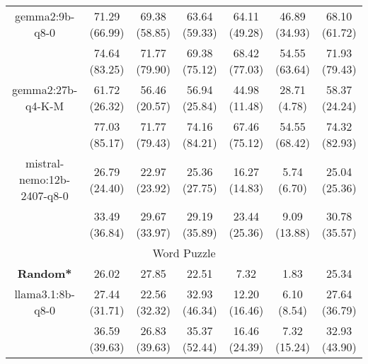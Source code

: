 \begin{table}[]
{\begin{tabular}{ccccccc}
        \multicolumn{1}{c|}{gemma2:9b-q8-0} & 71.29 (66.99) & 69.38 (58.85) & \multicolumn{1}{c|}{63.64 (59.33)} & 64.11 (49.28) & \multicolumn{1}{c|}{46.89 (34.93)} & 68.10 (61.72) \\
        
        

        \multicolumn{1}{c|}{} & 74.64 (83.25) & 71.77 (79.90) & \multicolumn{1}{c|}{69.38 (75.12)} & 68.42 (77.03) & \multicolumn{1}{c|}{54.55 (63.64)} & 71.93 (79.43) \\
        \cline{1-7}
        

        \multicolumn{1}{c|}{gemma2:27b-q4-K-M} & 61.72 (26.32) & 56.46 (20.57) & \multicolumn{1}{c|}{56.94 (25.84)} & 44.98 (11.48) & \multicolumn{1}{c|}{28.71 (4.78)} & 58.37 (24.24) \\
        
        

        \multicolumn{1}{c|}{} & 77.03 (85.17) & 71.77 (79.43) & \multicolumn{1}{c|}{74.16 (84.21)} & 67.46 (75.12) & \multicolumn{1}{c|}{54.55 (68.42)} & 74.32 (82.93) \\
        \cline{1-7}
        

        \multicolumn{1}{c|}{mistral-nemo:12b-2407-q8-0} & 26.79 (24.40) & 22.97 (23.92) & \multicolumn{1}{c|}{25.36 (27.75)} & 16.27 (14.83) & \multicolumn{1}{c|}{5.74 (6.70)} & 25.04 (25.36) \\
        
        

        \multicolumn{1}{c|}{} & 33.49 (36.84) & 29.67 (33.97) & \multicolumn{1}{c|}{29.19 (35.89)} & 23.44 (25.36) & \multicolumn{1}{c|}{9.09 (13.88)} & 30.78 (35.57) \\
        \cline{1-7}
        
\hline
\multicolumn{7}{c}{Word Puzzle} \\ \hline
\multicolumn{1}{c|}{\textbf{Random*}} & 26.02 & 27.85 & \multicolumn{1}{c|}{22.51} & 7.32 & \multicolumn{1}{c|}{1.83} & 25.34 \\ \hline

        \multicolumn{1}{c|}{llama3.1:8b-q8-0} & 27.44 (31.71) & 22.56 (32.32) & \multicolumn{1}{c|}{32.93 (46.34)} & 12.20 (16.46) & \multicolumn{1}{c|}{6.10 (8.54)} & 27.64 (36.79) \\
        
        

        \multicolumn{1}{c|}{} & 36.59 (39.63) & 26.83 (39.63) & \multicolumn{1}{c|}{35.37 (52.44)} & 16.46 (24.39) & \multicolumn{1}{c|}{7.32 (15.24)} & 32.93 (43.90) \\
        \cline{1-7}
        


\end{tabular}}
\end{table}
